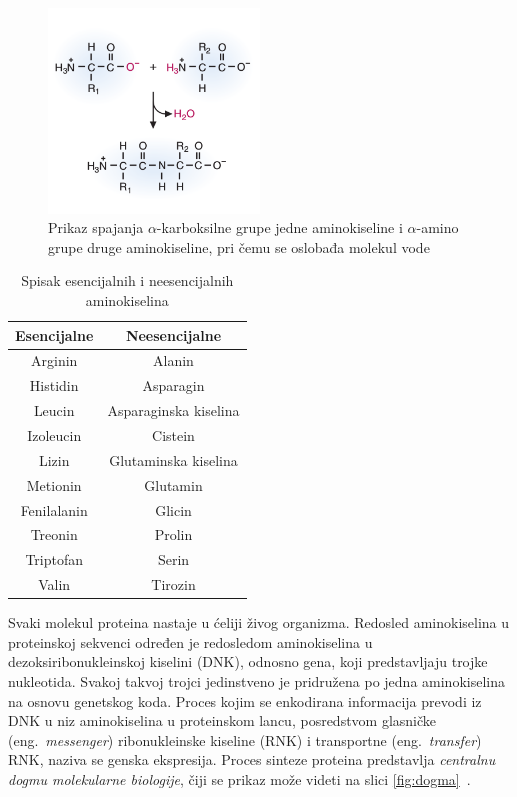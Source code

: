 \begin{figure}[H]
	\centering
    \includegraphics[width=0.5\textwidth]{Figures/BO/peptide_bonds.png}
    \caption{Prikaz spajanja $\alpha$-karboksilne grupe jedne aminokiseline i $\alpha$-amino grupe druge aminokiseline, pri čemu se oslobađa molekul vode ~\cite{bmbg}}
    \label{fig:peptidebonds}
\end{figure}

\begin{table}[h!]
\centering
	\begin{tabular}{|c c|} 
	\hline 
	Esencijalne & Neesencijalne \\ [0.5ex] 
	\hline\hline
	Arginin & Alanin \\ 
	\hline
	Histidin & Asparagin \\
	\hline
	Leucin & Asparaginska kiselina\\
	\hline
	Izoleucin & Cistein \\
	\hline
	Lizin & Glutaminska kiselina \\ [1ex] 
	\hline
	Metionin & Glutamin \\ [1ex] 
	\hline
	Fenilalanin & Glicin \\ [1ex] 
	\hline
	Treonin & Prolin \\ [1ex] 
	\hline
	Triptofan & Serin \\ [1ex] 
	\hline
	Valin & Tirozin \\ [1ex] 
	\hline
	\end{tabular}
\caption{Spisak esencijalnih i neesencijalnih aminokiselina}
\label{table:1}
\end{table}

Svaki molekul proteina nastaje u ćeliji živog organizma. Redosled aminokiselina u proteinskoj sekvenci određen je redosledom aminokiselina u dezoksiribonukleinskoj kiselini (DNK), odnosno gena, koji predstavljaju trojke nukleotida. Svakoj takvoj trojci jedinstveno je pridružena po jedna aminokiselina na osnovu genetskog koda. Proces kojim se enkodirana informacija prevodi iz DNK u niz aminokiselina u proteinskom lancu, posredstvom glasničke (eng.~{\em messenger}) ribonukleinske kiseline (RNK) i transportne (eng.~{\em transfer}) RNK, naziva se genska ekspresija. Proces sinteze proteina predstavlja \textit{centralnu dogmu molekularne biologije}, čiji se prikaz može videti na slici \ref{fig:dogma}~\cite{JKd}.

